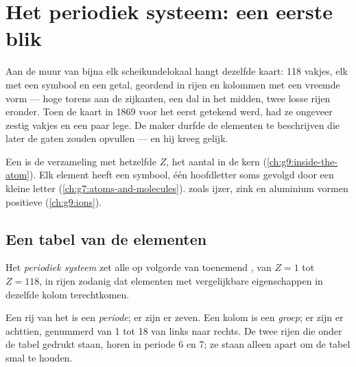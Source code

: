\chapter{Het periodiek systeem: een eerste blik}\label{ch:g9:periodic-table-first-look}

Aan de muur van bijna elk scheikundelokaal hangt dezelfde kaart: 118
vakjes, elk met een symbool en een getal, geordend in rijen en kolommen
met een vreemde vorm --- hoge torens aan de zijkanten, een dal in het
midden, twee losse rijen eronder. Toen de kaart in 1869 voor het eerst
getekend werd, had ze ongeveer zestig vakjes en een paar lege. De maker
durfde de elementen te beschrijven die later de gaten zouden opvullen
--- en hij kreeg gelijk.

\begin{recall}
Een  is de verzameling  met hetzelfde 
$Z$, het aantal  in de kern (\cref{ch:g9:inside-the-atom}). Elk
element heeft een symbool, één hoofdletter soms gevolgd door een kleine
letter (\cref{ch:g7:atoms-and-molecules}).  zoals ijzer, zink en
aluminium vormen positieve  (\cref{ch:g9:ions}).
\end{recall}

\section{Een tabel van de elementen}

\begin{definition}\label{def:g9:periodic-table-first-look:periodic-table}
Het \emph{periodiek systeem} zet alle  op volgorde van toenemend , van $Z = 1$ tot
$Z = 118$, in rijen zodanig dat elementen met vergelijkbare
eigenschappen in dezelfde kolom terechtkomen.
\end{definition}

\begin{definition}\label{def:g9:periodic-table-first-look:period}
Een rij van het  is een \emph{periode};
er zijn er zeven. Een kolom is een \emph{groep}; er zijn er
achttien, genummerd van 1 tot 18 van links naar rechts. De twee rijen
die onder de tabel gedrukt staan, horen in periode 6 en 7; ze staan
alleen apart om de tabel smal te houden.
\end{definition}

